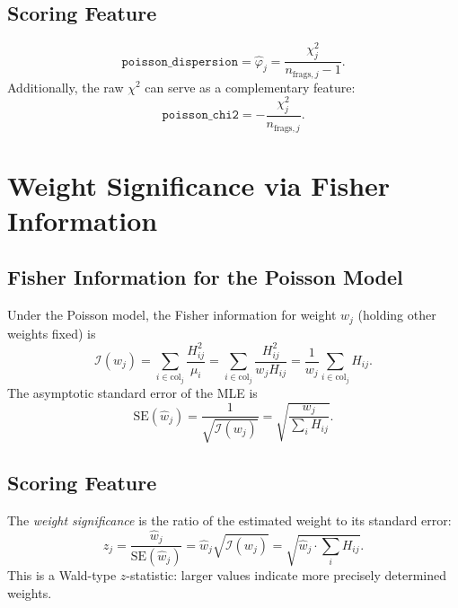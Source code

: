 \documentclass[11pt,a4paper]{article}
\begin{document}
\subsection{Scoring Feature}

\begin{equation}
    \texttt{poisson\_dispersion} = \hat{\varphi}_j = \frac{\chi^2_j}{n_{\text{frags},j} - 1}.
\end{equation}
Additionally, the raw $\chi^2$ can serve as a complementary feature:
\begin{equation}
    \texttt{poisson\_chi2} = -\frac{\chi^2_j}{n_{\text{frags},j}}.
\end{equation}

\section{Weight Significance via Fisher Information}
\label{sec:weight-significance}

\subsection{Fisher Information for the Poisson Model}

Under the Poisson model, the Fisher information for weight $w_j$ (holding other weights
fixed) is
\begin{equation}
    \mathcal{I}(w_j) = \sum_{i \in \text{col}_j} \frac{H_{ij}^2}{\mu_i}
    = \sum_{i \in \text{col}_j} \frac{H_{ij}^2}{w_j H_{ij}}
    = \frac{1}{w_j} \sum_{i \in \text{col}_j} H_{ij}.
\end{equation}
The asymptotic standard error of the MLE is
\begin{equation}
    \text{SE}(\hat{w}_j) = \frac{1}{\sqrt{\mathcal{I}(w_j)}}
    = \sqrt{\frac{w_j}{\sum_i H_{ij}}}.
\end{equation}

\subsection{Scoring Feature}

The \emph{weight significance} is the ratio of the estimated weight to its standard error:
\begin{equation}
    z_j = \frac{\hat{w}_j}{\text{SE}(\hat{w}_j)}
    = \hat{w}_j \sqrt{\mathcal{I}(w_j)}
    = \sqrt{\hat{w}_j \cdot \textstyle\sum_i H_{ij}}.
    \label{eq:weight-sig}
\end{equation}
This is a Wald-type $z$-statistic: larger values indicate more precisely determined weights.
\end{document}

